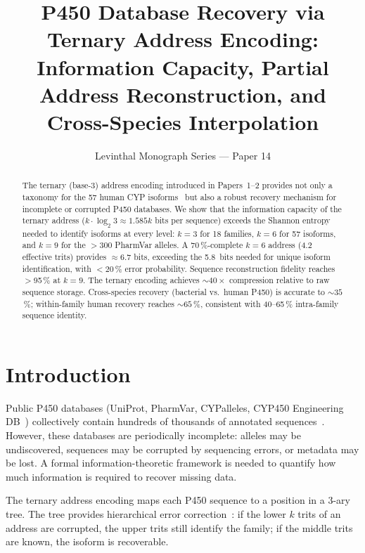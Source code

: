 \documentclass[11pt,twocolumn,a4paper]{article}
\title{\textbf{P450 Database Recovery via Ternary Address Encoding:\\
Information Capacity, Partial Address Reconstruction, and\\
Cross-Species Interpolation}}
\author{Levinthal Monograph Series --- Paper 14}
\date{}
\begin{document}
\maketitle

\begin{abstract}
The ternary (base-3) address encoding introduced in Papers~1--2 provides not
only a taxonomy for the 57 human CYP isoforms~\citep{Nelson2004} but also a robust recovery
mechanism for incomplete or corrupted P450 databases.  We show that the
information capacity of the ternary address ($k \cdot \log_2 3 \approx 1.585k$
bits per sequence) exceeds the Shannon entropy needed to identify isoforms
at every level: $k=3$ for 18 families, $k=6$ for 57 isoforms, and $k=9$ for
the $>$300 PharmVar alleles.  A 70\,\%-complete $k=6$ address (4.2 effective
trits) provides $\approx 6.7$ bits, exceeding the 5.8~bits needed for unique
isoform identification, with $<20$\,\% error probability.  Sequence
reconstruction fidelity reaches $>$95\,\% at $k=9$.  The ternary encoding
achieves $\sim 40\times$ compression relative to raw sequence storage.
Cross-species recovery (bacterial vs.\ human P450) is accurate to $\sim 35$\,\%;
within-family human recovery reaches $\sim 65$\,\%, consistent with
40--65\,\% intra-family sequence identity.
\end{abstract}

\tableofcontents
\newpage

\section{Introduction}

Public P450 databases (UniProt, PharmVar, CYPalleles, CYP450 Engineering DB~\citep{Preissner2010})
collectively contain hundreds of thousands of annotated sequences~\citep{Gaedigk2018}.  However,
these databases are periodically incomplete: alleles may be undiscovered,
sequences may be corrupted by sequencing errors, or metadata may be lost.
A formal information-theoretic framework is needed to quantify how much
information is required to recover missing data.

The ternary address encoding maps each P450 sequence to a position in a
3-ary tree.  The tree provides hierarchical error correction~\citep{Hamming1950}: if the lower
$k$ trits of an address are corrupted, the upper trits still identify the
family; if the middle trits are known, the isoform is recoverable.
\end{document}
